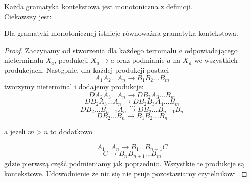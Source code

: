 Każda gramatyka kontekstowa jest monotoniczna z definicji.\\
Ciekawszy jest:\\
\begin{lemma}
	Dla gramatyki monotonicznej istnieje równoważna gramatyka kontekstowa.

\end{lemma}
\begin{proof}
	Zaczynamy od stworzenia dla każdego terminalu \(a\) odpowiadającego nieterminalu \(X_a\), produkcji \(X_a \rightarrow a\) oraz podmianie \(a\) na \(X_a\) we wszystkich produkcjach.
	Następnie, dla każdej produkcji postaci
	\[
		A_1A_2...A_n \rightarrow B_1B_2...B_m
	\]
	tworzymy nieterminal  i dodajemy produkcje:
	\[
		DA_2A_3...A_n \rightarrow DB_2A_3...B_m
	\]
	\[
		DB_2A_3...A_n \rightarrow DB_2B_3A_4...B_m
	\]
	\[
		...
	\]
	\[
		DB_2...B_{n-1}A_n \rightarrow DB_2...B_{n-1}B_n
	\]
	\[
		DB_2...B_n \rightarrow B_1B_2...B_n
	\]

	a jeżeli \( m > n \) to dodatkowo

	\[
		A_1...A_n \rightarrow B_1...B_{n-1}C
	\]
	\[
		C \rightarrow B_nB_{n+1}...B_m
	\]
	gdzie pierwszą część podmieniamy jak poprzednio. Wszystkie te produkcje są kontekstowe. Udowodnienie że nic się nie psuje pozostawiamy czytelnikowi.
\end{proof}
